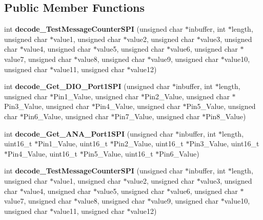 \subsection*{Public Member Functions}
\begin{DoxyCompactItemize}
\item 
\mbox{\label{classSPIMessageHandler_ada1eb1bb3a8b9b5502bda00fba0ca94a}} 
int {\bfseries decode\+\_\+\+Test\+Message\+Counter\+S\+PI} (unsigned char $\ast$inbuffer, int $\ast$length, unsigned char $\ast$value1, unsigned char $\ast$value2, unsigned char $\ast$value3, unsigned char $\ast$value4, unsigned char $\ast$value5, unsigned char $\ast$value6, unsigned char $\ast$value7, unsigned char $\ast$value8, unsigned char $\ast$value9, unsigned char $\ast$value10, unsigned char $\ast$value11, unsigned char $\ast$value12)
\item 
\mbox{\label{classSPIMessageHandler_a2b9ff957d26bab1f655fa4ff2baf01d5}} 
int {\bfseries decode\+\_\+\+Get\+\_\+\+D\+I\+O\+\_\+\+Port1\+S\+PI} (unsigned char $\ast$inbuffer, int $\ast$length, unsigned char $\ast$Pin1\+\_\+\+Value, unsigned char $\ast$Pin2\+\_\+\+Value, unsigned char $\ast$Pin3\+\_\+\+Value, unsigned char $\ast$Pin4\+\_\+\+Value, unsigned char $\ast$Pin5\+\_\+\+Value, unsigned char $\ast$Pin6\+\_\+\+Value, unsigned char $\ast$Pin7\+\_\+\+Value, unsigned char $\ast$Pin8\+\_\+\+Value)
\item 
\mbox{\label{classSPIMessageHandler_ad9fc58bd2868dde40560fa16ed82764d}} 
int {\bfseries decode\+\_\+\+Get\+\_\+\+A\+N\+A\+\_\+\+Port1\+S\+PI} (unsigned char $\ast$inbuffer, int $\ast$length, uint16\+\_\+t $\ast$Pin1\+\_\+\+Value, uint16\+\_\+t $\ast$Pin2\+\_\+\+Value, uint16\+\_\+t $\ast$Pin3\+\_\+\+Value, uint16\+\_\+t $\ast$Pin4\+\_\+\+Value, uint16\+\_\+t $\ast$Pin5\+\_\+\+Value, uint16\+\_\+t $\ast$Pin6\+\_\+\+Value)
\item 
\mbox{\label{classSPIMessageHandler_ada1eb1bb3a8b9b5502bda00fba0ca94a}} 
int {\bfseries decode\+\_\+\+Test\+Message\+Counter\+S\+PI} (unsigned char $\ast$inbuffer, int $\ast$length, unsigned char $\ast$value1, unsigned char $\ast$value2, unsigned char $\ast$value3, unsigned char $\ast$value4, unsigned char $\ast$value5, unsigned char $\ast$value6, unsigned char $\ast$value7, unsigned char $\ast$value8, unsigned char $\ast$value9, unsigned char $\ast$value10, unsigned char $\ast$value11, unsigned char $\ast$value12)

\end{DoxyCompactItemize}
